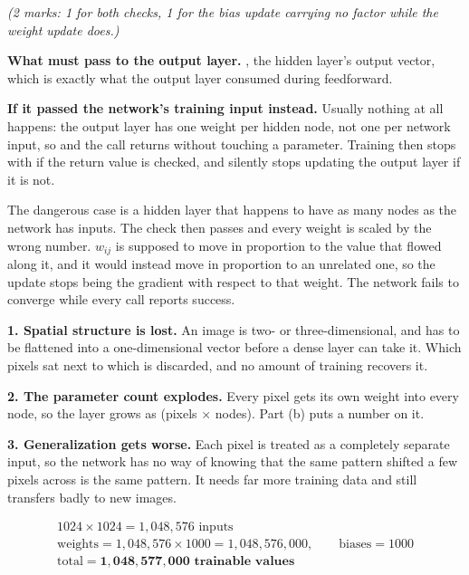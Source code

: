 \noindent\textit{(2 marks: 1 for both checks, 1 for the bias update carrying no 
factor while the weight update does.)}

\textbf{What  must pass to the output layer.} ,
the hidden layer's output vector, which is exactly what the output layer consumed during
feedforward. 

\textbf{If it passed the network's training input instead.} Usually nothing at all happens: the
output layer has one weight per hidden node, not one per network input, so
 and the call returns  without touching a parameter.
Training then stops with  if the return value is checked, and silently stops updating
the output layer if it is not.

The dangerous case is a hidden layer that happens to have as many nodes as the network has inputs.
The check then passes and every weight is scaled by the wrong number. $w_{ij}$ is supposed to move in
proportion to the value that flowed along it, and it would instead move in proportion to an unrelated
one, so the update stops being the gradient with respect to that weight. The network fails to
converge while every call reports success. 


\textbf{1. Spatial structure is lost.} An image is two- or three-dimensional, and has to be
flattened into a one-dimensional vector before a dense layer can take it. Which pixels sat next to
which is discarded, and no amount of training recovers it.

\textbf{2. The parameter count explodes.} Every pixel gets its own weight into every node, so the
layer grows as (pixels $\times$ nodes). Part (b) puts a number on it.

\textbf{3. Generalization gets worse.} Each pixel is treated as a completely separate input, so the
network has no way of knowing that the same pattern shifted a few pixels across is the same pattern.
It needs far more training data and still transfers badly to new images. 

\begin{gather*}
  1024 \times 1024 = 1{,}048{,}576 \text{ inputs} \\
  \text{weights} = 1{,}048{,}576 \times 1000 = 1{,}048{,}576{,}000, \qquad \text{biases} = 1000 \\
  \text{total} = \mathbf{1{,}048{,}577{,}000 \text{ trainable values}}
\end{gather*}

